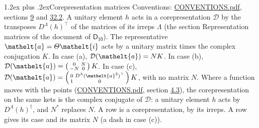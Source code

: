 \documentclass[10pt,a4paper]{article}
\makeatletter
\renewcommand\section{\@startsection{section}{1}{\z@}{-3ex plus -1ex minus -.2ex}%
  {1.2ex plus .2ex}{\normalfont\large\sffamily\bfseries\color{parttitle}}}
\numberwithin{equation}{section}
\newcommand{\eltfont}[1]{{\let\sigma\eltsigma\mathelt{#1}}}
\newcommand{\grp}[1]{\mathsf{#1}}
\newcommand{\elt}[1]{\eltfont{#1}}
\makeatother
\begin{document}
\section{Corepresentation matrices}\label{s:corep_matrices}
Conventions: \href{../../CONVENTIONS.pdf}{CONVENTIONS.pdf}, sections \href{../../../rotation/CONVENTIONS.pdf\#conv.9}{9} and \href{../../CONVENTIONS.pdf\#conv.32.2}{32.2}.
A unitary element $h$ acts in a corepresentation $\mathcal{D}$ by the transposes $D^{\Lambda}(h)^{\top}$ of the matrices of its irreps $\Lambda$ (the section Representation matrices of the document of \href{../../../rotation/data/pdf/D10.pdf}{$\grp{D_{10}}$}). The representative $\elt{a} = \varTheta\elt{i}$ acts by a unitary matrix times the complex conjugation $K$.
In case (a), $\mathcal{D}(\elt{a}) = NK$. In case (b), $\mathcal{D}(\elt{a}) = \left(\begin{smallmatrix} 0 & N \\ -N & 0 \end{smallmatrix}\right) K$. In case (c), $\mathcal{D}(\elt{a}) = \left(\begin{smallmatrix} 0 & D^{\Lambda}(\elt{a}^2)^{\top} \\ 1 & 0 \end{smallmatrix}\right) K$, with no matrix $N$.
Where a function moves with the points (\href{../../CONVENTIONS.pdf}{CONVENTIONS.pdf}, section \href{../../../rotation/CONVENTIONS.pdf\#conv.4.3}{4.3}), the corepresentation on the same kets is the complex conjugate of $\mathcal{D}$: a unitary element $h$ acts by $D^{\Lambda}(h)^{\dagger}$, and $N^{*}$ replaces $N$.
A row is a corepresentation, by its irreps. A row gives its case and its matrix $N$ (a dash in case (c)).
\end{document}
